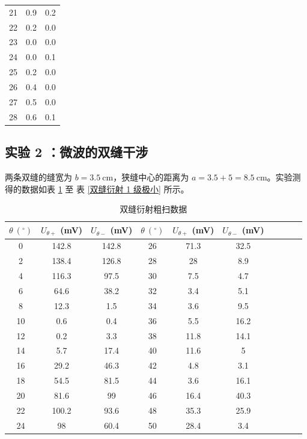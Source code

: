 \documentclass[UTF8]{article}
\theoremstyle{MyLineTheoremStyle} %
\theoremstyle{MyBlockTheoremStyle} %
\theoremstyle{MySubsubsectionStyle} %
\begin{document}
\begin{center}
\begin{minipage}{0.35\columnwidth}
\begin{table}[H]
\begin{tabular}{ccc}
        21	&0.9	&0.2 \\
        22	&0.2	&0.0 \\
        23	&0.0	&0.0 \\
        24	&0.0	&0.1 \\
        25	&0.2	&0.0 \\
        26	&0.4	&0.0 \\
        27	&0.5	&0.0 \\
        28	&0.6	&0.1 \\
        \bottomrule
    \end{tabular}
    \end{table}
\end{minipage}\end{center}


\subsection{实验 2 ：微波的双缝干涉}
两条双缝的缝宽为 $b = 3.5 \ \mathrm{cm}$，狭缝中心的距离为 $a = 3.5 + 5 = 8.5 \ \mathrm{cm}$。实验测得的数据如表 \ref{双缝衍射粗扫数据} 至 表 \ref{双缝衍射 1 级极小} 所示。


\begin{table}[H]\centering
    \caption{双缝衍射粗扫数据}
    \label{双缝衍射粗扫数据}
\begin{tabular}{cccccccccc}\toprule
    $\theta \ \mathrm{(^\circ)}$  & $U_{\theta+}$ (mV) & $U_{\theta-}$ (mV) & $\theta \ \mathrm{(^\circ)}$  & $U_{\theta+}$ (mV) & $U_{\theta-}$ (mV) \\
    \midrule
    0	&142.8	&142.8 &26	&71.3	&32.5   \\
    2	&138.4	&126.8 &28	&28	    &8.9    \\
    4	&116.3	&97.5  &30	&7.5	&4.7    \\
    6	&64.6	&38.2  &32	&3.4	&5.1    \\
    8	&12.3	&1.5   &34	&3.6	&9.5    \\
    10	&0.6	&0.4   &36	&5.5	&16.2   \\
    12	&0.2	&3.3   &38	&11.8	&14.1   \\
    14	&5.7	&17.4  &40	&11.6	&5      \\
    16	&29.2	&46.3  &42	&4.8	&3.1    \\
    18	&54.5	&81.5  &44	&3.6	&16.1   \\
    20	&81.6	&99    &46	&16.4	&40.3   \\
    22	&100.2	&93.6  &48	&35.3	&25.9   \\
    24	&98	    &60.4  &50	&28.4	&3.4    \\
    \bottomrule
\end{tabular}
\end{table}
\end{document}
